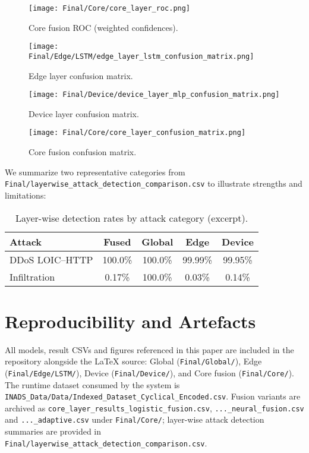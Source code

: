 \documentclass[conference]{IEEEtran}
\begin{document}
\begin{figure}[htbp]
\centering
\texttt{[image: Final/Core/core\_layer\_roc.png]}
\caption{Core fusion ROC (weighted confidences).}
\label{fig:roc_core}
\end{figure}

\begin{figure}[htbp]
\centering
\texttt{[image: Final/Edge/LSTM/edge\_layer\_lstm\_confusion\_matrix.png]}
\caption{Edge layer confusion matrix.}
\label{fig:cm_edge}
\end{figure}

\begin{figure}[htbp]
\centering
\texttt{[image: Final/Device/device\_layer\_mlp\_confusion\_matrix.png]}
\caption{Device layer confusion matrix.}
\label{fig:cm_device}
\end{figure}

\begin{figure}[htbp]
\centering
\texttt{[image: Final/Core/core\_layer\_confusion\_matrix.png]}
\caption{Core fusion confusion matrix.}
\label{fig:cm_core}
\end{figure}

\noindent We summarize two representative categories from \texttt{Final/layerwise\_attack\_detection\_comparison.csv} to illustrate strengths and limitations:

\begin{table}[htbp]
\caption{Layer-wise detection rates by attack category (excerpt).}
\begin{center}
\begin{tabular}{|l|c|c|c|c|}
\hline
Attack & Fused & Global & Edge & Device \\
\hline
DDoS LOIC--HTTP & 100.0\% & 100.0\% & 99.99\% & 99.95\% \\
Infiltration & 0.17\% & 100.0\% & 0.03\% & 0.14\% \\
\hline
\end{tabular}
\end{center}
\label{tab:attack_by_layer}
\end{table}

\section{Reproducibility and Artefacts}
All models, result CSVs and figures referenced in this paper are included in the repository alongside the LaTeX source: Global (\texttt{Final/Global/}), Edge (\texttt{Final/Edge/LSTM/}), Device (\texttt{Final/Device/}), and Core fusion (\texttt{Final/Core/}). The runtime dataset consumed by the system is \texttt{INADS\_Data/Data/Indexed\_Dataset\_Cyclical\_Encoded.csv}. Fusion variants are archived as \texttt{core\_layer\_results\_logistic\_fusion.csv}, \texttt{...\_neural\_fusion.csv} and \texttt{...\_adaptive.csv} under \texttt{Final/Core/}; layer-wise attack detection summaries are provided in \texttt{Final/layerwise\_attack\_detection\_comparison.csv}.
\end{document}
